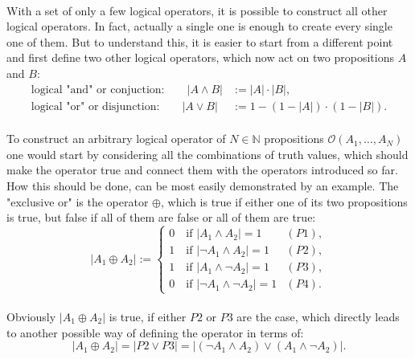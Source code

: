 \paragraph*{}
With a set of only a few logical operators, it is possible to construct all other logical operators. In fact, actually a single one is enough to create every single one of them. But to understand this, it is easier to start from a different point and first define two other logical operators, which now act on two propositions $ A $ and $ B $:
\begin{align}
\text{logical "and" or conjuction:}\quad\quad |A \land B| &:= |A|\cdot|B|, \\
\text{logical "or" or disjunction:}\quad\quad |A \lor B| &:= 1-(1-|A|)\cdot (1-|B|).
\end{align}

\paragraph*{}
To construct an arbitrary logical operator of $ N \in \mathbb{N} $ propositions $ \mathcal{O}(A_1,\dots,A_N) $ one would start by considering all the combinations of truth values, which should make the operator true and connect them with the operators introduced so far. How this should be done, can be most easily demonstrated by an example. The "exclusive or" is the operator $ \oplus $, which is true if either one of its two propositions is true, but false if all of them are false or all of them are true:
\begin{equation}\label{eq:XOR}
|A_1\oplus A_2| := 
\begin{cases}
0 \quad\text{if } |A_1\land A_2| = 1 &(P1),\\
1 \quad\text{if } |\neg A_1\land A_2| = 1 &(P2),\\
1 \quad\text{if } |A_1\land \neg A_2| = 1 &(P3),\\
0 \quad\text{if } |\neg A_1\land \neg A_2| = 1 &(P4).
\end{cases}
\end{equation}

\paragraph*{}
Obviously $ |A_1\oplus A_2| $ is true, if either $ P2 $ or $ P3 $ are the case, which directly leads to another possible way of defining the operator in terms of:
\begin{equation}
|A_1\oplus A_2| = |P2\lor P3| = |(\neg A_1\land A_2)\lor (A_1 \land \neg A_2)|.
\end{equation}

